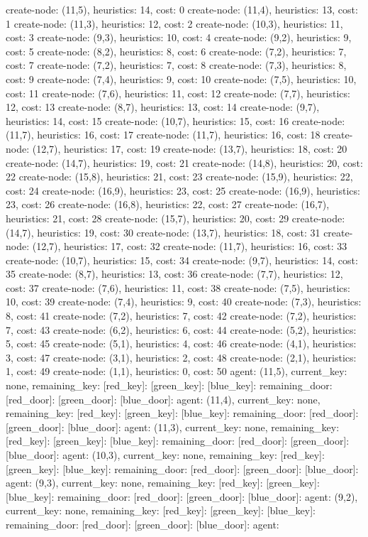 \begin{tcolorbox}[title=Response (CoT and Answer), colback=white]
\tiny
create-node: (11,5), heuristics: 14, cost: 0 create-node: (11,4), heuristics: 13, cost: 1 create-node: (11,3), heuristics: 12, cost: 2 create-node: (10,3), heuristics: 11, cost: 3 create-node: (9,3), heuristics: 10, cost: 4 create-node: (9,2), heuristics: 9, cost: 5 create-node: (8,2), heuristics: 8, cost: 6 create-node: (7,2), heuristics: 7, cost: 7 create-node: (7,2), heuristics: 7, cost: 8 create-node: (7,3), heuristics: 8, cost: 9 create-node: (7,4), heuristics: 9, cost: 10 create-node: (7,5), heuristics: 10, cost: 11 create-node: (7,6), heuristics: 11, cost: 12 create-node: (7,7), heuristics: 12, cost: 13 create-node: (8,7), heuristics: 13, cost: 14 create-node: (9,7), heuristics: 14, cost: 15 create-node: (10,7), heuristics: 15, cost: 16 create-node: (11,7), heuristics: 16, cost: 17 create-node: (11,7), heuristics: 16, cost: 18 create-node: (12,7), heuristics: 17, cost: 19 create-node: (13,7), heuristics: 18, cost: 20 create-node: (14,7), heuristics: 19, cost: 21 create-node: (14,8), heuristics: 20, cost: 22 create-node: (15,8), heuristics: 21, cost: 23 create-node: (15,9), heuristics: 22, cost: 24 create-node: (16,9), heuristics: 23, cost: 25 create-node: (16,9), heuristics: 23, cost: 26 create-node: (16,8), heuristics: 22, cost: 27 create-node: (16,7), heuristics: 21, cost: 28 create-node: (15,7), heuristics: 20, cost: 29 create-node: (14,7), heuristics: 19, cost: 30 create-node: (13,7), heuristics: 18, cost: 31 create-node: (12,7), heuristics: 17, cost: 32 create-node: (11,7), heuristics: 16, cost: 33 create-node: (10,7), heuristics: 15, cost: 34 create-node: (9,7), heuristics: 14, cost: 35 create-node: (8,7), heuristics: 13, cost: 36 create-node: (7,7), heuristics: 12, cost: 37 create-node: (7,6), heuristics: 11, cost: 38 create-node: (7,5), heuristics: 10, cost: 39 create-node: (7,4), heuristics: 9, cost: 40 create-node: (7,3), heuristics: 8, cost: 41 create-node: (7,2), heuristics: 7, cost: 42 create-node: (7,2), heuristics: 7, cost: 43 create-node: (6,2), heuristics: 6, cost: 44 create-node: (5,2), heuristics: 5, cost: 45 create-node: (5,1), heuristics: 4, cost: 46 create-node: (4,1), heuristics: 3, cost: 47 create-node: (3,1), heuristics: 2, cost: 48 create-node: (2,1), heuristics: 1, cost: 49 create-node: (1,1), heuristics: 0, cost: 50 agent: (11,5), current\_key: none, remaining\_key: [red\_key]: [green\_key]: [blue\_key]: remaining\_door: [red\_door]: [green\_door]: [blue\_door]:  agent: (11,4), current\_key: none, remaining\_key: [red\_key]: [green\_key]: [blue\_key]: remaining\_door: [red\_door]: [green\_door]: [blue\_door]:  agent: (11,3), current\_key: none, remaining\_key: [red\_key]: [green\_key]: [blue\_key]: remaining\_door: [red\_door]: [green\_door]: [blue\_door]:  agent: (10,3), current\_key: none, remaining\_key: [red\_key]: [green\_key]: [blue\_key]: remaining\_door: [red\_door]: [green\_door]: [blue\_door]:  agent: (9,3), current\_key: none, remaining\_key: [red\_key]: [green\_key]: [blue\_key]: remaining\_door: [red\_door]: [green\_door]: [blue\_door]:  agent: (9,2), current\_key: none, remaining\_key: [red\_key]: [green\_key]: [blue\_key]: remaining\_door: [red\_door]: [green\_door]: [blue\_door]:  agent: 
\end{tcolorbox}
